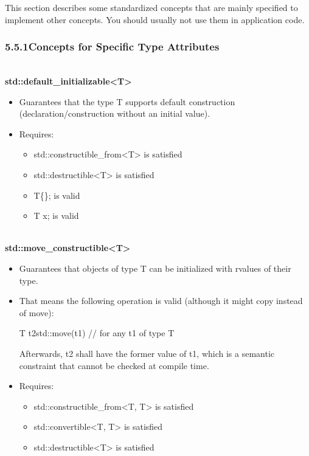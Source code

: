

This section describes some standardized concepts that are mainly specified to implement other concepts. You should usually not use them in application code.


\subsubsection*{ 5.5.1\hspace{0.2cm}Concepts for Specific Type Attributes}

\noindent
\hspace*{\fill} \\ %
\textbf{std::default\_initializable<T>}

\begin{itemize}
\item
Guarantees that the type T supports default construction (declaration/construction without an initial value).

\item
Requires:
\begin{itemize}
\item
std::constructible\_from<T> is satisfied

\item
std::destructible<T> is satisfied

\item
T\{\}; is valid

\item
T x; is valid
\end{itemize}
\end{itemize}

\noindent
\hspace*{\fill} \\ %
\textbf{std::move\_constructible<T>}

\begin{itemize}
\item
Guarantees that objects of type T can be initialized with rvalues of their type.

\item
That means the following operation is valid (although it might copy instead of move):

\begin{cpp}
T t2{std::move(t1)} // for any t1 of type T
\end{cpp}

Afterwards, t2 shall have the former value of t1, which is a semantic constraint that cannot be checked at compile time.

\item
Requires:
\begin{itemize}
\item
std::constructible\_from<T, T> is satisfied

\item
std::convertible<T, T> is satisfied

\item
std::destructible<T> is satisfied
\end{itemize}
\end{itemize}


